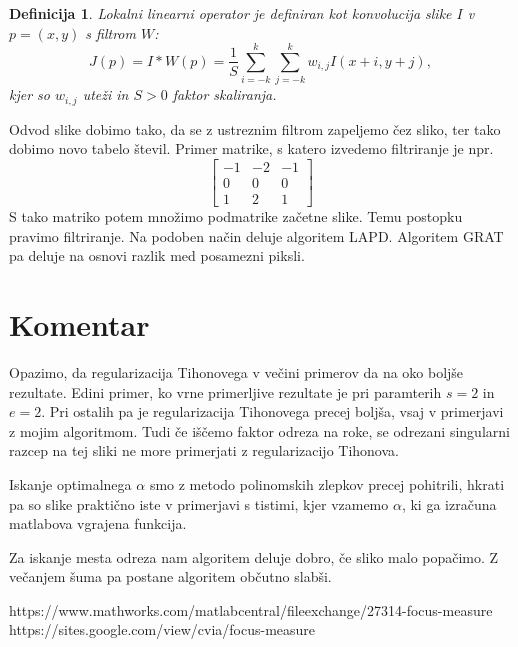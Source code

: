 \documentclass[a4paper,12pt]{article}
\newtheorem{definicija}{Definicija}
\begin{document}
\begin{definicija}
	\emph{Lokalni linearni operator} je definiran kot \emph{konvolucija} slike $I$ v $p = (x, y)$ s filtrom $W$:
	$$ J(p) = I * W(p) = \frac{1}{S}\sum_{i=-k}^{k}\sum_{j=-k}^{k}w_{i,j}I(x+i, y+j),$$
	kjer so $w_{i,j}$ uteži in $S > 0$ faktor skaliranja. 
\end{definicija}
Odvod slike dobimo tako, da se z ustreznim filtrom zapeljemo čez sliko, ter tako dobimo novo tabelo števil. 
Primer matrike, s katero izvedemo filtriranje je npr. 
$$ \begin{bmatrix}
-1 & -2 & -1 \\
0 & 0 & 0 \\
1 & 2 & 1 
\end{bmatrix}  $$
S tako matriko potem množimo podmatrike začetne slike. Temu postopku pravimo filtriranje. Na podoben način  deluje algoritem LAPD. Algoritem GRAT pa deluje na osnovi razlik med posamezni piksli. 


\section{Komentar}
Opazimo, da regularizacija Tihonovega v večini primerov da na oko boljše rezultate. Edini primer, ko vrne primerljive rezultate je pri paramterih $s=2$  in $e=2$. Pri ostalih pa je regularizacija Tihonovega precej boljša, vsaj v primerjavi z mojim algoritmom. Tudi če iščemo faktor odreza na roke, se odrezani singularni razcep na tej sliki ne more primerjati z regularizacijo Tihonova. 

Iskanje optimalnega $\alpha$ smo z metodo polinomskih zlepkov precej pohitrili, hkrati pa so slike praktično iste v primerjavi s tistimi, kjer vzamemo $\alpha$, ki ga izračuna matlabova vgrajena funkcija. 

Za iskanje mesta odreza nam algoritem deluje dobro, če sliko malo popačimo. Z večanjem šuma pa postane algoritem občutno slabši. 



\begin{thebibliography}{1}
	https://www.mathworks.com/matlabcentral/fileexchange/27314-focus-measure 
	https://sites.google.com/view/cvia/focus-measure
\end{thebibliography}
\end{document}
